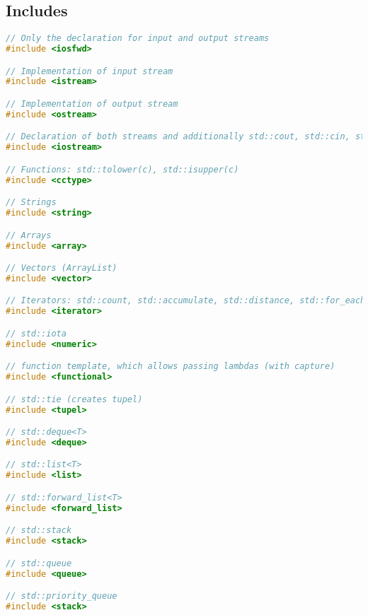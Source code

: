 
\subsection{Includes}
\begin{lstlisting}[style=frame, style= linenumbers, language=C]
// Only the declaration for input and output streams
#include <iosfwd>

// Implementation of input stream
#include <istream>

// Implementation of output stream
#include <ostream>

// Declaration of both streams and additionally std::cout, std::cin, std::cerr
#include <iostream>

// Functions: std::tolower(c), std::isupper(c)
#include <cctype>

// Strings
#include <string>

// Arrays
#include <array>

// Vectors (ArrayList)
#include <vector>

// Iterators: std::count, std::accumulate, std::distance, std::for_each
#include <iterator>

// std::iota
#include <numeric>

// function template, which allows passing lambdas (with capture)
#include <functional>

// std::tie (creates tupel)
#include <tupel>

// std::deque<T>
#include <deque>

// std::list<T>
#include <list>

// std::forward_list<T>
#include <forward_list>

// std::stack
#include <stack>

// std::queue
#include <queue>

// std::priority_queue
#include <stack>
\end{lstlisting}